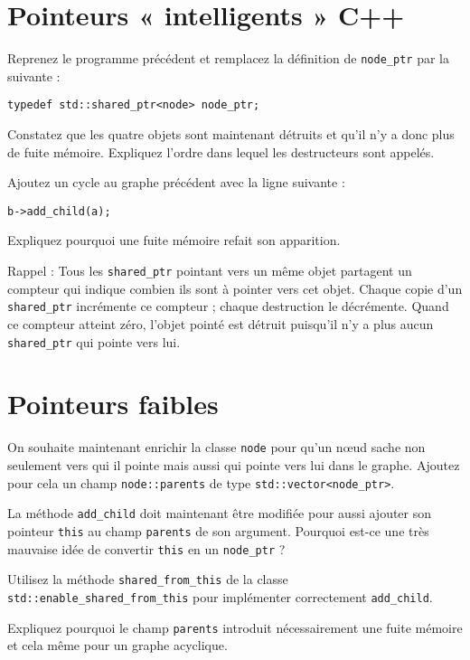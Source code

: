 \documentclass[a4paper]{article}
\begin{document}
\section{Pointeurs « intelligents » C++}

Reprenez le programme précédent et remplacez la définition de
\lstinline|node_ptr| par la suivante :
\begin{lstlisting}
typedef std::shared_ptr<node> node_ptr;
\end{lstlisting}

Constatez que les quatre objets sont maintenant détruits et qu'il n'y a
donc plus de fuite mémoire. Expliquez l'ordre dans lequel les
destructeurs sont appelés.

Ajoutez un cycle au graphe précédent avec la ligne suivante :
\begin{lstlisting}
b->add_child(a);
\end{lstlisting}

Expliquez pourquoi une fuite mémoire refait son apparition.

Rappel : Tous les \lstinline|shared_ptr| pointant vers un même objet
partagent un compteur qui indique combien ils sont à pointer vers cet
objet. Chaque copie d'un \lstinline|shared_ptr| incrémente ce
compteur ; chaque destruction le décrémente. Quand ce compteur atteint
zéro, l'objet pointé est détruit puisqu'il n'y a plus aucun
\lstinline|shared_ptr| qui pointe vers lui.

\section{Pointeurs faibles}

On souhaite maintenant enrichir la classe \lstinline|node| pour qu'un
nœud sache non seulement vers qui il pointe mais aussi qui pointe vers
lui dans le graphe. Ajoutez pour cela un champ \lstinline|node::parents|
de type \lstinline|std::vector<node_ptr>|.

La méthode \lstinline|add_child| doit maintenant être modifiée pour aussi
ajouter son pointeur \lstinline|this| au champ \lstinline|parents| de son
argument. Pourquoi est-ce une très mauvaise idée de convertir
\lstinline|this| en un \lstinline|node_ptr| ?

Utilisez la méthode \lstinline|shared_from_this| de la classe
\lstinline|std::enable_shared_from_this| pour implémenter correctement
\lstinline|add_child|.

Expliquez pourquoi le champ \lstinline|parents| introduit nécessairement
une fuite mémoire et cela même pour un graphe acyclique.
\end{document}
